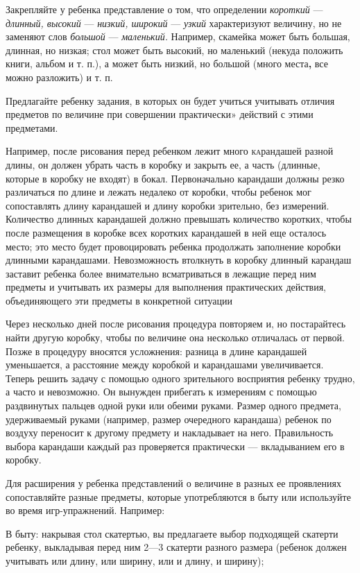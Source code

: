\documentclass[a5paper]{book}
\renewcommand{\emph}[1]{\textit{#1}}
\begin{document}
Закрепляйте у ребенка представление о том, что определении
\emph{короткий} --- \emph{длинный, высокий} --- \emph{низкий, широкий}
--- \emph{узкий} характеризуют величину, но не заменяют слов
\emph{большой} --- \emph{маленький.} Например, скамейка может быть
большая, длинная, но низкая; стол может быть высокий, но маленький
(некуда положить книги, альбом и т. п.), а может быть низкий, но большой
(много места\textbf{,} все можно разложить) и т. п.

Предлагайте ребенку задания, в которых он будет учиться учитывать
отличия предметов по величине при совершении практически» действий с
этими предметами.

Например, после рисования перед ребенком лежит много \textsc{ка}рандашей
разной длины, он должен убрать часть в коробку и закрыть ее, а часть
(длинные, которые в коробку не входят) в бокал. Первоначально карандаши
должны резко различаться по длине и лежать недалеко от коробки, чтобы
ребенок мог сопоставлять длину карандашей и длину коробки зрительно, без
измерений. Количество длинных карандашей должно превышать количество
коротких, чтобы после размещения в коробке всех коротких карандашей в
ней еще осталось место; это место будет провоцировать ребенка продолжать
заполнение коробки длинными карандашами. Невозможность втолкнуть в
коробку длинный карандаш заставит ребенка более внимательно
всматриваться в лежащие перед ним предметы и учитывать их размеры для
выполнения практических действия, объединяющего эти предметы в
конкретной ситуации

Через несколько дней после рисования процедура повторяем и, но
постарайтесь найти другую коробку, чтобы по величине она несколько
отличалась от первой. Позже в процедуру вносятся усложнения: разница в
длине карандашей уменьшается, а расстояние между коробкой и карандашами
увеличивается. Теперь решить задачу с помощью одного зрительного
восприятия ребенку трудно, а часто и невозможно. Он вынужден прибегать к
измерениям с помощью раздвинутых пальцев одной руки или обеими руками.
Размер одного предмета, удерживаемый руками (например, размер очередного
карандаша) ребенок по воздуху переносит к другому предмету и накладывает
на него. Правильность выбора карандаши каждый раз проверяется
практически --- вкладыванием его в коробку.

Для расширения у ребенка представлений о величине в разных ее
проявлениях сопоставляйте разные предметы, которые употребляются в быту
или используйте во время игр-упражнений. Например:

В быту: накрывая стол скатертью, вы предлагаете выбор подходящей
скатерти ребенку, выкладывая перед ним 2---3 скатерти разного размера
(ребенок должен учитывать или длину, или ширину, или и длину, и ширину);
\end{document}
